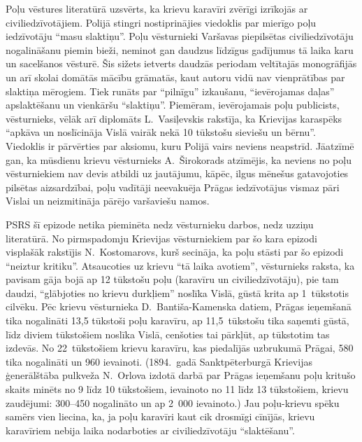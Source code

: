 \documentclass[twoside,a5paper,12pt,fleqn,openany]{extbook}
\begin{document}
Poļu vēstures literatūrā uzsvērts, ka krievu karavīri zvērīgi izrīkojās ar civiliedzīvotājiem. Polijā stingri nostiprinājies viedoklis par mierīgo poļu iedzīvotāju ``masu slaktiņu''. Poļu vēsturnieki Varšavas piepilsētas civiliedzīvotāju nogalināšanu piemin bieži, neminot gan daudzus līdzīgus gadījumus tā laika karu un sacelšanos vēsturē. Šis sižets ietverts daudzās periodam veltītajās monogrāfijās un arī skolai domātās mācību grāmatās, kaut autoru vidū nav vienprātības par slaktiņa mērogiem. Tiek runāts par ``pilnīgu'' izkaušanu, ``ievērojamas daļas'' apslaktēšanu un vienkāršu ``slaktiņu''. Piemēram, ievērojamais poļu publicists, vēsturnieks, vēlāk arī diplomāts L.~Vasiļevskis rakstīja, ka Krievijas karaspēks ``apkāva un noslīcināja Vislā vairāk nekā 10 tūkstošu sieviešu un bērnu''. Viedoklis ir pārvērties par aksiomu, kuru Polijā vairs neviens neapstrīd. Jāatzīmē gan, ka mūsdienu krievu vēsturnieks A.~Širokorads atzīmējis, ka neviens no poļu vēsturniekiem nav devis atbildi uz jautājumu, kāpēc, ilgus mēnešus gatavojoties pilsētas aizsardzībai, poļu vadītāji neevakuēja Prāgas iedzīvotājus vismaz pāri Vislai un neizmitināja pārējo varšaviešu namos.

PSRS šī epizode netika pieminēta nedz vēsturnieku darbos, nedz uzziņu literatūrā. No pirmspadomju Krievijas vēsturniekiem par šo kara epizodi visplašāk rakstījis N.~Kostomarovs, kurš secināja, ka poļu stāsti par šo epizodi ``neiztur kritiku''. Atsaucoties uz krievu ``tā laika avotiem'', vēsturnieks raksta, ka pavisam gāja bojā ap 12 tūkstošu poļu (karavīru un civiliedzīvotāju), pie tam daudzi, ``glābjoties no krievu durkļiem'' noslīka Vislā, gūstā krita ap 1~tūkstotis cilvēku. Pēc krievu vēsturnieka D.~Bantiša-Kamenska datiem, Prāgas ieņemšanā tika nogalināti 13,5 tūkstoši poļu karavīru, ap 11,5~tūkstošu tika saņemti gūstā, līdz diviem tūkstošiem noslīka Vislā, cenšoties tai pārkļūt, ap tūkstotim tas izdevās. No 22~tūkstošiem krievu karavīru, kas piedalījās uzbrukumā Prāgai, 580 tika nogalināti un 960 ievainoti. (1894.~gadā Sanktpēterburgā Krievijas ģenerālštāba pulkveža N.~Orlova izdotā darbā par Prāgas ieņemšanu poļu kritušo skaits minēts no 9 līdz 10 tūkstošiem, ievainoto no 11 līdz 13 tūkstošiem, krievu zaudējumi: 300--450 nogalināto un ap 2~000 ievainoto.) Jau poļu-krievu spēku samērs vien liecina, ka, ja poļu karavīri kaut cik drosmīgi cīnījās, krievu karavīriem nebija laika nodarboties ar civiliedzīvotāju ``slaktēšanu''.
\end{document}
